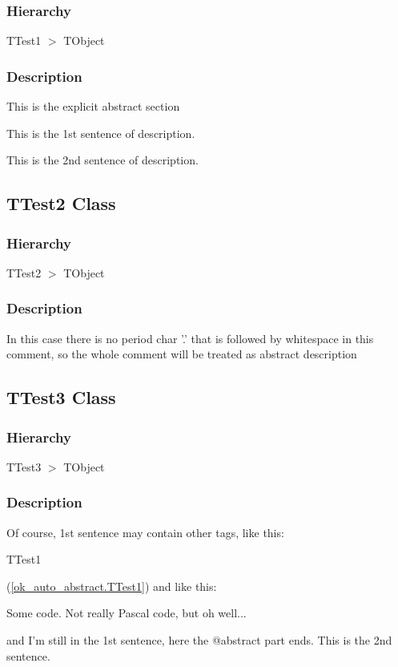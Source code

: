 \documentclass{report}
\begin{document}
\subsubsection*{\large{\textbf{Hierarchy}}\normalsize\hspace{1ex}\hfill}
TTest1 {$>$} TObject
\subsubsection*{\large{\textbf{Description}}\normalsize\hspace{1ex}\hfill}
This is the explicit abstract section\hfill\vspace*{1ex}

This is the 1st sentence of description.

This is the 2nd sentence of description.

\subsection*{TTest2 Class}
\subsubsection*{\large{\textbf{Hierarchy}}\normalsize\hspace{1ex}\hfill}
TTest2 {$>$} TObject
\subsubsection*{\large{\textbf{Description}}\normalsize\hspace{1ex}\hfill}
In this case there is no period char '.' that is followed by whitespace in this comment, so the whole comment will be treated as abstract description\subsection*{TTest3 Class}
\subsubsection*{\large{\textbf{Hierarchy}}\normalsize\hspace{1ex}\hfill}
TTest3 {$>$} TObject
\subsubsection*{\large{\textbf{Description}}\normalsize\hspace{1ex}\hfill}
Of course, 1st sentence may contain other tags, like this: \begin{ttfamily}TTest1\end{ttfamily}(\ref{ok_auto_abstract.TTest1}) and like this: \begin{ttfamily}Some code. Not really Pascal code, but oh well...\end{ttfamily} and I'm still in the 1st sentence, here the @abstract part ends. This is the 2nd sentence.
\end{document}

